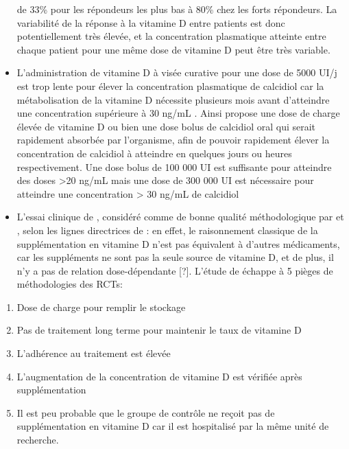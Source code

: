 \documentclass[
  a4paper,
  DIV=11,
  numbers=noendperiod,
  listof=totoc]{scrreprt}
\providecommand{\tightlist}{%
  \setlength{\itemsep}{0pt}\setlength{\parskip}{0pt}}\usepackage{longtable,booktabs,array}
\begin{document}
\begin{itemize}
  de 33\% pour les répondeurs les plus bas à 80\% chez les forts
  répondeurs. La variabilité de la réponse à la vitamine D entre
  patients est donc potentiellement très élevée, et la concentration
  plasmatique atteinte entre chaque patient pour une même dose de
  vitamine D peut être très variable.
\item
  L'administration de vitamine D à visée curative pour une dose de 5000
  UI/j est trop lente pour élever la concentration plasmatique de
  calcidiol car la métabolisation de la vitamine D nécessite plusieurs
  mois avant d'atteindre une concentration supérieure à 30 ng/mL
  \autocite{Mocanu.2009}. Ainsi \textcite{Wimalawansa.2022} propose une
  dose de charge élevée de vitamine D ou bien une dose bolus de
  calcidiol oral qui serait rapidement absorbée par l'organisme, afin de
  pouvoir rapidement élever la concentration de calcidiol à atteindre en
  quelques jours ou heures respectivement. Une dose bolus de 100 000 UI
  est suffisante pour atteindre des doses \textgreater20 ng/mL mais une
  dose de 300 000 UI est nécessaire pour atteindre une concentration
  \textgreater{} 30 ng/mL de calcidiol \autocite{Kearns.2014}
\item
  L'essai clinique de \textcite{Murai.2021}, considéré comme de bonne
  qualité méthodologique par \textcite{Annweiler.2021} et
  \textcite{Argano.2023}, selon les lignes directrices de
  \textcite{Heaney.2014} : en effet, le raisonnement classique de la
  supplémentation en vitamine D n'est pas équivalent à d'autres
  médicaments, car les suppléments ne sont pas la seule source de
  vitamine D, et de plus, il n'y a pas de relation dose-dépendante
  {[}?{]}. L'étude de \textcite{Murai.2021} échappe à 5 pièges de
  méthodologies des \acp{RCT}:
\end{itemize}

\begin{enumerate}
\def\labelenumi{\arabic{enumi})}
\tightlist
\item
  Dose de charge pour remplir le stockage
\item
  Pas de traitement long terme pour maintenir le taux de vitamine D
\item
  L'adhérence au traitement est élevée
\item
  L'augmentation de la concentration de vitamine D est vérifiée après
  supplémentation
\item
  Il est peu probable que le groupe de contrôle ne reçoit pas de
  supplémentation en vitamine D car il est hospitalisé par la même unité
  de recherche.
\end{enumerate}
\end{document}
